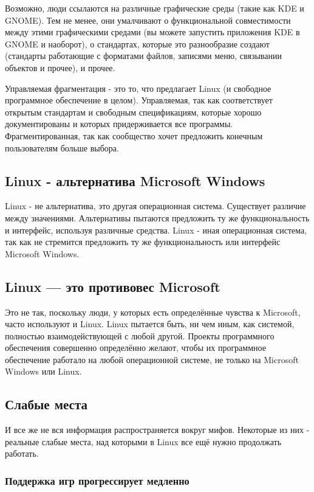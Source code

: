 \documentclass[10pt]{book}
\begin{document}
Возможно, люди ссылаются на различные графические среды (такие как KDE и GNOME). Тем не менее, они умалчивают о функциональной совместимости между этими графическими средами (вы можете запустить приложения KDE в GNOME и наоборот), о стандартах, которые это разнообразие создают (стандарты работающие с форматами файлов, записями меню, связывании объектов и прочее), и прочее.

Управляемая фрагментация - это то, что предлагает Linux (и свободное программное обеспечение в целом). Управляемая, так как соответствует открытым стандартам и свободным спецификациям, которые хорошо документированы и которых придерживается все программы. Фрагментированная, так как сообщество хочет предложить  конечным пользователям больше выбора.

\subsection{Linux - альтернатива Microsoft Windows}

Linux - не альтернатива, это другая операционная система. Существует различие между значениями. Альтернативы пытаются предложить ту же функциональность и интерфейс, используя различные средства. Linux - иная операционная система, так как не стремится предложить ту же функциональность или интерфейс Microsoft Windows.

\subsection{Linux — это противовес Microsoft}

Это не так, поскольку люди, у которых есть определённые чувства к Microsoft, часто используют и Linux. Linux пытается быть, ни чем иным, как системой, полностью взаимодействующей с любой другой. Проекты программного обеспечения совершенно определённо желают, чтобы их программное обеспечение работало на любой операционной системе, не только на Microsoft Windows или Linux.

\subsection{Слабые места}

И все же не вся информация распространяется вокруг мифов. Некоторые из них - реальные слабые места, над которыми в Linux все ещё нужно продолжать работать.

\subsubsection{Поддержка игр прогрессирует медленно}
\end{document}
